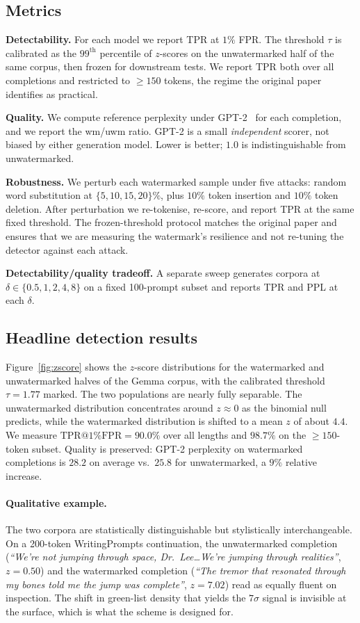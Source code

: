 \documentclass[10pt,twocolumn,letterpaper]{article}
\begin{document}
\subsection{Metrics}
\textbf{Detectability.} For each model we report TPR at $1\%$ FPR. The threshold $\tau$ is calibrated as the $99^{\text{th}}$ percentile of $z$-scores on the unwatermarked half of the same corpus, then frozen for downstream tests. We report TPR both over all completions and restricted to $\geq\!150$ tokens, the regime the original paper identifies as practical.

\textbf{Quality.} We compute reference perplexity under GPT-2~\cite{gpt2} for each completion, and we report the wm/uwm ratio. GPT-2 is a small \emph{independent} scorer, not biased by either generation model. Lower is better; $1.0$ is indistinguishable from unwatermarked.

\textbf{Robustness.} We perturb each watermarked sample under five attacks: random word substitution at $\{5,10,15,20\}\%$, plus $10\%$ token insertion and $10\%$ token deletion. After perturbation we re-tokenise, re-score, and report TPR at the same fixed threshold. The frozen-threshold protocol matches the original paper and ensures that we are measuring the watermark's resilience and not re-tuning the detector against each attack.

\textbf{Detectability/quality tradeoff.} A separate sweep generates corpora at $\delta\!\in\!\{0.5,1,2,4,8\}$ on a fixed 100-prompt subset and reports TPR and PPL at each $\delta$.

\subsection{Headline detection results}
\label{sec:headline}
Figure~\ref{fig:zscore} shows the $z$-score distributions for the watermarked and unwatermarked halves of the Gemma corpus, with the calibrated threshold $\tau{=}1.77$ marked. The two populations are nearly fully separable. The unwatermarked distribution concentrates around $z\!\approx\!0$ as the binomial null predicts, while the watermarked distribution is shifted to a mean $z$ of about $4.4$. We measure $\mathrm{TPR}@1\%\mathrm{FPR}=90.0\%$ over all lengths and $98.7\%$ on the $\geq\!150$-token subset. Quality is preserved: GPT-2 perplexity on watermarked completions is $28.2$ on average vs.\ $25.8$ for unwatermarked, a $9\%$ relative increase.

\paragraph{Qualitative example.}
The two corpora are statistically distinguishable but stylistically interchangeable. On a 200-token WritingPrompts continuation, the unwatermarked completion (\emph{``We're not jumping through space, Dr.\ Lee\ldots We're jumping through realities''}, $z{=}0.50$) and the watermarked completion (\emph{``The tremor that resonated through my bones told me the jump was complete''}, $z{=}7.02$) read as equally fluent on inspection. The shift in green-list density that yields the $7\sigma$ signal is invisible at the surface, which is what the scheme is designed for.
\end{document}
